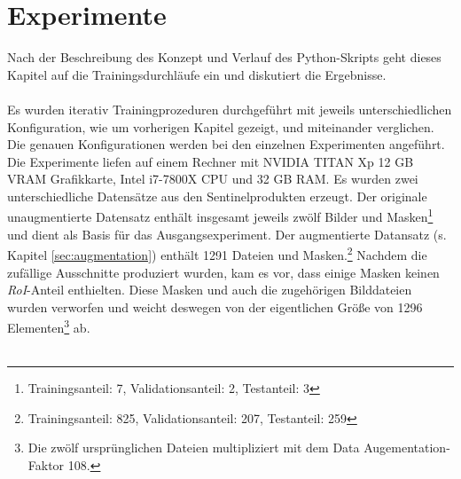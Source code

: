 \chapter{Experimente}\label{chap:experiments}

Nach der Beschreibung des Konzept und Verlauf des Python-Skripts geht dieses Kapitel auf die Trainingsdurchläufe ein und diskutiert die Ergebnisse. 
\\\\
Es wurden iterativ Trainingprozeduren durchgeführt mit jeweils unterschiedlichen Konfiguration, wie um vorherigen Kapitel gezeigt, und miteinander verglichen. Die genauen Konfigurationen werden bei den einzelnen Experimenten angeführt. Die Experimente liefen auf einem Rechner mit NVIDIA TITAN Xp 12 GB VRAM Grafikkarte, Intel i7-7800X CPU und 32 GB RAM. Es wurden zwei unterschiedliche Datensätze aus den Sentinelprodukten erzeugt. Der originale unaugmentierte Datensatz enthält insgesamt jeweils zwölf Bilder und Masken\footnote{Trainingsanteil: 7, Validationsanteil: 2, Testanteil: 3} und dient als Basis für das Ausgangsexperiment. Der augmentierte Datansatz (s. Kapitel \ref{sec:augmentation}) enthält 1291 Dateien und Masken.\footnote{Trainingsanteil: 825, Validationsanteil: 207, Testanteil: 259} Nachdem die zufällige Ausschnitte produziert wurden, kam es vor, dass einige Masken keinen \textit{RoI}-Anteil enthielten. Diese Masken und auch die zugehörigen Bilddateien wurden verworfen und weicht deswegen von der eigentlichen Größe von 1296 Elementen\footnote{Die zwölf ursprünglichen Dateien multipliziert mit dem Data Augementation-Faktor 108.} ab.
\\\\
